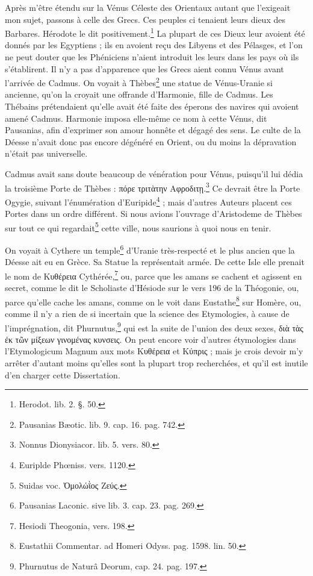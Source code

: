\documentclass[a4paper, 18pt, oneside]{article}
\begin{document}
Après m'être étendu sur la Vénus Céleste des Orientaux autant que l'exigeait mon sujet, passons à celle des Grecs. Ces peuples ci tenaient leurs dieux des Barbares. Hérodote le dit positivement.\footnote{Herodot. lib. 2. §. 50.} La plupart de ces Dieux leur avoient été donnés par les Egyptiens ; ils en avoient reçu des Libyens et des Pélasges, et l'on ne peut douter que les Phéniciens n'aient introduit les leurs dans les pays où ils s'établirent. Il n'y a pas d'apparence que les Grecs aient connu Vénus avant l'arrivée de Cadmus. On voyait à Thèbes\footnote{Pausanias Bæotic. lib. 9. cap. 16. pag. 742.} une statue de Vénus-Uranie si ancienne, qu'on la croyait une offrande d'Harmonie, fille de Cadmus. Les Thébains prétendaient qu'elle avait été faite des éperons des navires qui avoient amené Cadmus. Harmonie imposa elle-même ce nom à cette Vénus, dit Pausanias, afin d'exprimer son amour honnête et dégagé des sens. Le culte de la Déesse n'avait donc pas encore dégénéré en Orient, ou du moins la dépravation n'était pas universelle.

Cadmus avait sans doute beaucoup de vénération pour Vénus, puisqu'il lui dédia la troisième Porte de Thèbes : πόρε τριτὰτην Αφροδιτῃ.\footnote{Nonnus Dionysiacor. lib. 5. vers. 80.} Ce devrait être la Porte Ogygie, suivant l'énumération d'Euripide\footnote{Euriplde Phœniss. vers. 1120.} ; mais d'autres Auteurs placent ces Portes dans un ordre différent. Si nous avions l'ouvrage d'Aristodeme de Thèbes sur tout ce qui regardait\footnote{Suidas voc. Ὀμολώῒος Ζεύς.} cette ville, nous saurions à quoi nous en tenir.

On voyait à Cythere un temple\footnote{Pausanias Laconic. sive lib. 3. cap. 23. pag. 269.} d'Uranie très-respecté et le plus ancien que la Déesse ait eu en Grèce. Sa Statue la représentait armée. De cette Isle elle prenait le nom de Κυθέρεια Cythérée,\footnote{Hesiodi Theogonia, vers. 198.} ou, parce que les amans se cachent et agissent en secret, comme le dit le Scholiaste d'Hésiode sur le vers 196 de la Théogonie, ou, parce qu'elle cache les amans, comme on le voit dans Eustathe\footnote{Eustathii Commentar. ad Homeri Odyss. pag. 1598. lin. 50.} sur Homère, ou, comme il n'y a rien de si incertain que la science des Etymologies, à cause de l'imprégnation, dit Phurnutus,\footnote{Phurnutus de Naturâ Deorum, cap. 24. pag. 197.} qui est la suite de l'union des deux sexes, διὰ τὰς ἐκ τῶν μίξεων γινομένας κυνσεις. On peut encore voir d'autres étymologies dans l'Etymologicum Magnum aux mots Κυθέρεια et Κύπρις ; mais je crois devoir m'y arrêter d'autant moins qu'elles sont la plupart trop recherchées, et qu'il est inutile d'en charger cette Dissertation.
\end{document}
